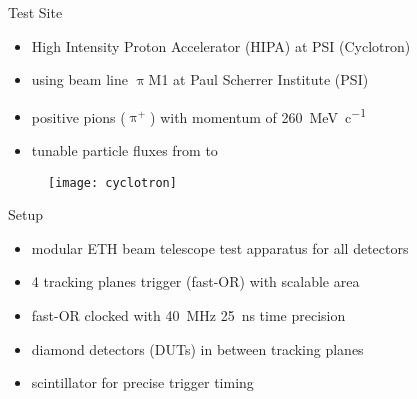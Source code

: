 \begin{frame}{Test Site}

	\begin{itemize}
		\itemfill
		\item High Intensity Proton Accelerator (HIPA) at PSI (Cyclotron)
		\item using beam line $\uppi$M1 at Paul Scherrer Institute (PSI)
		\item positive pions ($\uppi^+$) with momentum of \SI{260}{\mega\electronvolt\per c} 
		\item tunable particle fluxes from  to 
	\end{itemize}
	
	\begin{figure}
		\centering
		\texttt{[image: cyclotron]}
	\end{figure}
		
\end{frame}
\begin{frame}{Setup}
 
	\begin{figure}
		\centering
	\end{figure}\vspace*{-5pt}
 
	\begin{itemize}
		\itemfill
		\item modular ETH beam telescope \ra test apparatus for all detectors
		\item 4 tracking planes \ra trigger (fast-OR) with scalable area
		\item fast-OR clocked with \SI{40}{\mega\hertz} \ra \SI{25}{\nano\second} time precision
		\item diamond detectors (DUTs) in between tracking planes
		\item scintillator for precise trigger timing \ra {}
	\end{itemize}

\end{frame}

